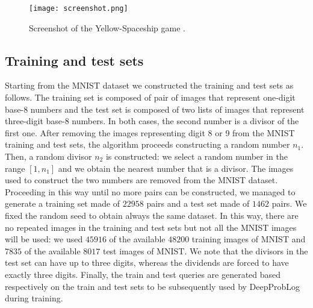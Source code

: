 

\begin{figure}[ht]
\centerline{\texttt{[image: screenshot.png]}}
\caption{Screenshot of the Yellow-Spaceship game \cite{Yellow-Spaceship}.}
\label{fig:game_screenshot}
\end{figure}


\subsection{Training and test sets}
Starting from the MNIST dataset we constructed the training and test sets as follows. The training set is composed of pair of images that represent one-digit base-8 numbers and the test set is composed of two lists of images that represent three-digit base-8 numbers. In both cases, the second number is a divisor of the first one. 
After removing the images representing digit 8 or 9 from the MNIST training and test sets, the algorithm proceeds constructing a random number $n_1$. Then, a random divisor $n_2$ is constructed: we select a random number in the range $[1,n_1]$ and we obtain the nearest number that is a divisor. The images used to construct the two numbers are removed from the MNIST dataset. Proceeding in this way until no more pairs can be constructed, we managed to generate a training set made of $22958$ pairs and a test set made of $1462$ pairs. We fixed the random seed to obtain always the same dataset. In this way, there are no repeated images in the training and test sets but not all the MNIST images will be used: we used $45916$ of the available $48200$ training images of MNIST and $7835$ of the available $8017$ test images of MNIST. We note that the divisors in the test set can have up to three digits, whereas the dividends are forced to have exactly three digits.
Finally, the train and test queries are generated based respectively on the train and test sets to be subsequently used by DeepProbLog during training.

